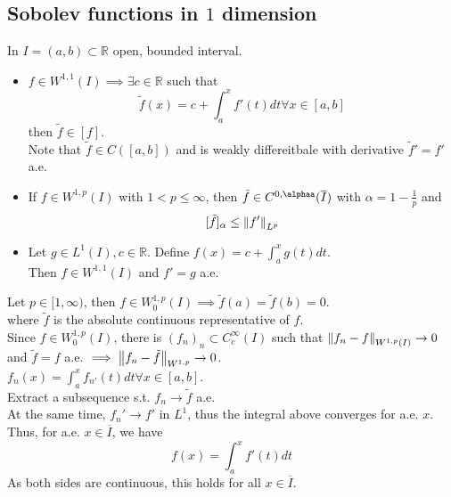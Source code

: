 \documentclass[../main.tex]{subfiles}
\begin{document}
\subsection{Sobolev functions in $1$ dimension}
In $I = ( a,b) \subset \mathbb{R}$ open, bounded interval.
\begin{thm}
	\begin{itemize}
	\item $f\in W^{1,1}( I) \implies \exists c \in \mathbb{R}$ such that
		\[ 
		\tilde f ( x) = c + \int_{ a }^{ x } f'( t) dt \forall x \in [ a,b] 
		\]
		then $\tilde f  \in [ f] $.\\
		Note that $\tilde f \in C( [ a,b] ) $ and is weakly differeitbale with derivative $\tilde f ' = f'$ a.e.

	\item If $f \in W^{1,p}( I) $ with $1< p \leq  \infty $, then $\tilde f \in C^{0,\alphaa}( \overline{I}) $ with $\alpha = 1- \frac{1}{p}$ and
		\[ 
		[ \tilde f] _{\alpha}  \leq  \left\lVert f'\right\rVert _{L^{p}} 
		\]

	\item Let $g \in L^{1}( I) , c \in \mathbb{R}$. Define $f( x) = c + \int_{ a }^{ x } g( t) dt$.\\
		Then $f\in W^{1,1}( I) $ and $f' =g $ a.e.
	\end{itemize}
\end{thm}
\begin{lemma}
Let $ p \in [ 1, \infty ) $, then $f \in W^{1,p}_0( I) \implies \tilde f ( a) = \tilde f ( b) =0$.\\
where $\tilde f $ is the absolute continuous representative of $f$.\\
Since $f\in W^{1,p}_0( I) $, there is $( f_n)_n \subset C^{ \infty }_c ( I) $ such that $ \left\lVert f_n -f \right\rVert_{W^{1,p}( I) } \to 0$ and $\tilde f = f $ a.e. $\implies \left\lVert f_n - \tilde f \right\rVert_{W^{1,p}} \to 0$.\\
$f_n( x) = \int_{ a }^{ x }f_{n'} ( t)  dt\forall x \in [ a,b] $.\\
Extract a subsequence s.t. $f_n \to \tilde f $ a.e.\\
At the same time, $f_n'\to f'$ in $L^{1}$, thus the integral above converges for a.e. $x$.\\
Thus, for a.e. $x\in \overline{I}$, we have 
\[ 
f( x) = \int_{ a }^{ x } f'( t) dt
\]
As both sides are continuous, this holds for all $x\in \overline{I}$.
\end{lemma}
\end{document}
